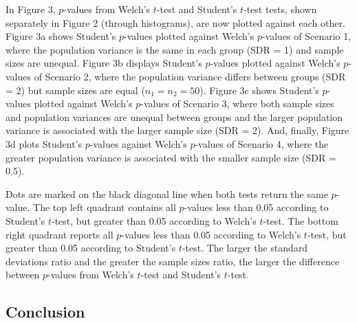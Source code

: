 \documentclass[
  english,
  man]{apa6}
\begin{document}
In Figure 3, \(p\)-values from Welch's \(t\)-test and Student's \(t\)-test tests, shown separately in Figure 2 (through histograms), are now plotted against each other. Figure 3a shows Student's \(p\)-values plotted against Welch's \(p\)-values of Scenario 1, where the population variance is the same in each group (SDR = 1) and sample sizes are unequal. Figure 3b displays Student's \(p\)-values plotted against Welch's \(p\)-values of Scenario 2, where the population variance differs between groups (SDR = 2) but sample sizes are equal (\(n_1= n_2 = 50\)). Figure 3c shows Student's \(p\)-values plotted against Welch's \(p\)-values of Scenario 3, where both sample sizes and population variances are unequal between groups and the larger population variance is associated with the larger sample size (SDR = 2). And, finally, Figure 3d plots Student's \(p\)-values against Welch's \(p\)-values of Scenario 4, where the greater population variance is associated with the smaller sample size (SDR = 0.5).

Dots are marked on the black diagonal line when both tests return the same \(p\)-value. The top left quadrant contains all \(p\)-values less than 0.05 according to Student's \(t\)-test, but greater than 0.05 according to Welch's \(t\)-test. The bottom right quadrant reports all \(p\)-values less than 0.05 according to Welch's \(t\)-test, but greater than 0.05 according to Student's \(t\)-test. The larger the standard deviations ratio and the greater the sample sizes ratio, the larger the difference between \(p\)-values from Welch's \(t\)-test and Student's \(t\)-test.

\hypertarget{conclusion}{%
\subsection{Conclusion}\label{conclusion}}
\end{document}
